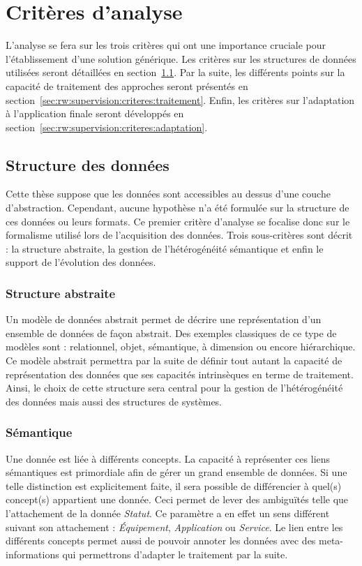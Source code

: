 \section{Critères d'analyse}\label{sec:rw:supervision:criteres}
L'analyse se fera sur les trois critères qui ont une importance cruciale pour l'établissement d'une solution générique. Les critères sur les structures de données utilisées seront détaillées en section~\ref{sec:rw:supervision:criteres:structure}. Par la suite, les différents points sur la capacité de traitement des approches seront présentés en section~\ref{sec:rw:supervision:criteres:traitement}. Enfin, les critères sur l'adaptation à l'application finale seront développés en section~\ref{sec:rw:supervision:criteres:adaptation}.

\subsection{Structure des données}\label{sec:rw:supervision:criteres:structure}
Cette thèse suppose que les données sont accessibles au dessus d'une couche d'abstraction. Cependant, aucune hypothèse n'a été formulée sur la structure de ces données ou leurs formats. Ce premier critère d'analyse se focalise donc sur le formalisme utilisé lors de l'acquisition des données. Trois sous-critères sont décrit : la structure abstraite, la gestion de l'hétérogénéité sémantique et enfin le support de l'évolution des données.

\subsubsection{Structure abstraite}
Un modèle de données abstrait permet de décrire une représentation d'un ensemble de données de façon abstrait. Des exemples classiques de ce type de modèles sont : relationnel, objet, sémantique, à dimension ou encore hiérarchique. Ce modèle abstrait permettra par la suite de définir tout autant la capacité de représentation des données que ses capacités intrinsèques en terme de traitement. Ainsi, le choix de cette structure sera central pour la gestion de l'hétérogénéité des données mais aussi des structures de systèmes.
\subsubsection{Sémantique}
Une donnée est liée à différents concepts. La capacité à représenter ces liens sémantiques est primordiale afin de gérer un grand ensemble de données. Si une telle distinction est explicitement faite, il sera possible de différencier à quel(s) concept(s) appartient une donnée. Ceci permet de lever des ambiguïtés telle que l'attachement de la donnée \textit{Statut}. Ce paramètre a en effet un sens différent suivant son attachement : \textit{Équipement}, \textit{Application} ou \textit{Service}. Le lien entre les différents concepts permet aussi de pouvoir annoter les données avec des meta-informations qui permettrons d'adapter le traitement par la suite.
